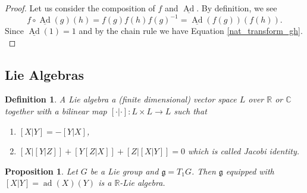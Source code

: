 \documentclass{article}
\newtheorem{proposition}{Proposition}[section]
\newtheorem{definition}{Definition}[section]
\numberwithin{equation}{section}
\DeclareMathOperator{\Ad}{Ad}
\DeclareMathOperator{\ad}{ad}
\begin{document}
\begin{proof}
Let us consider the composition of $f$ and $\underline{\Ad}$. By definition, we see
\begin{equation*}
f\circ\underline{\Ad}(g)(h) =  f(g)f(h)f(g)^{-1}=\underline{\Ad}(f(g))(f(h)).
\end{equation*}
Since $\underline{\Ad}(1) = 1$ and by the chain rule we have Equation \ref{nat_transform_gh}.\\
\par %
\end{proof}

\subsection{Lie Algebras}

\begin{definition}
A Lie algebra a (finite dimensional) vector space $L$ over $\mathbb{R}$ or $\mathbb{C}$ together with a bilinear map $[\cdot|\cdot]:L\times L\to L$ such that
\begin{enumerate}[i]
\item $[X|Y]=-[Y|X]$,
\item $[X|[Y|Z]]+[Y[Z|X]]+[Z|[X|Y]]=0$ which is called Jacobi identity.
\end{enumerate}
\end{definition}

\begin{proposition}
Let $G$ be a Lie group and $\mathfrak{g}=T_1G$. Then $\mathfrak{g}$ equipped with $[X|Y] = \ad(X)(Y)$ is a $\mathbb{R}$-Lie algebra.
\end{proposition}
\end{document}
